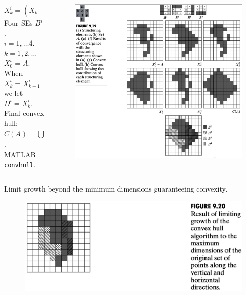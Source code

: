 \begin{frame}
\begin{columns}
\begin{column}{.4\textwidth}
$X_{k}^{i} = \left ( X_{k-1} \circledast B^{i} \right ) \cup A$\\
Four SEs $B^{i}$.\\
$i=1,\ldots 4$.\\
$k = 1, 2,\ldots$\\
$X_{0}^{i} = A$.\\
When $X_{k}^{i} = X_{k-1}^{i}$ we let $D^{i} = X_{k}^{i}$.\\
Final convex hull:\\
$C(A) = \bigcup_{i=1}^{4} D^{i}$.\\
MATLAB = \texttt{convhull}.
\end{column}
\begin{column}{.6\textwidth}
\begin{figure}[!h]
\includegraphics[width=.95\textwidth]{fig-9-19}
\end{figure}
\end{column}
\end{columns}
\end{frame}

\begin{frame}
Limit growth beyond the minimum dimensions guaranteeing convexity.
\begin{figure}[!h]
\includegraphics[width=\textwidth]{fig-9-20}
\end{figure}
\end{frame}

